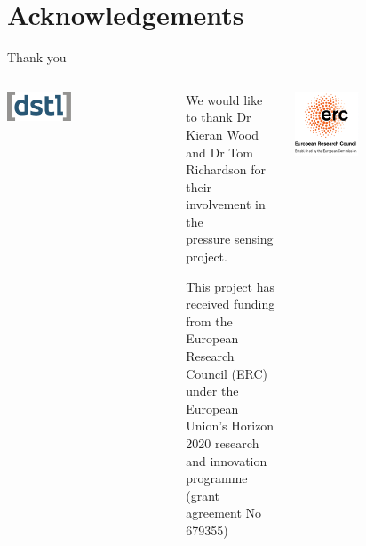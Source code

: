 \documentclass[aspectratio=169]{beamer}            %
\begin{document}
\section*{Acknowledgements}
\begin{frame}{}

  \vspace{2.5em}
  \centering
	\Huge{Thank you}

  \vspace{1em}
	\begin{columns}
	  \begin{column}{0.25\textwidth}
		  \centering
      \includegraphics[width=0.4\textwidth]{DstlLogo.eps}
		\end{column}
	  \begin{column}{0.5\textwidth}
		  \centering
			{\tiny We would like to thank Dr Kieran Wood and Dr Tom Richardson for their
			involvement in the\\[1em]
			pressure sensing project.\\[1em]}
			
		  {\tiny This project has received funding from the European Research Council (ERC)\\[1em]
        under the European Union’s Horizon 2020 research and innovation programme\\[1em]
        (grant agreement No 679355)\\[1em]}
    \end{column}
    \begin{column}{0.25\textwidth}
		  \centering
      \includegraphics[width=0.4\textwidth]{ERC_Logo.eps}
		\end{column}
  \end{columns}

\end{frame}
\appendix
\end{document}
